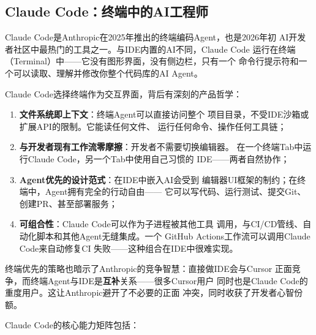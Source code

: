 \subsection{Claude Code：终端中的AI工程师}
\label{subsec:claude-code}

Claude Code是Anthropic在2025年推出的终端编码Agent，也是2026年初
AI开发者社区中最热门的工具之一。与IDE内置的AI不同，Claude Code
运行在终端（Terminal）中——它没有图形界面，没有侧边栏，只有一个
命令行提示符和一个可以读取、理解并修改你整个代码库的AI Agent。

\begin{whybox}[为什么是终端而不是IDE？]
Claude Code选择终端作为交互界面，背后有深刻的产品哲学：
\begin{enumerate}
  \item \textbf{文件系统即上下文}：终端Agent可以直接访问整个
    项目目录，不受IDE沙箱或扩展API的限制。它能读任何文件、
    运行任何命令、操作任何工具链；
  \item \textbf{与开发者现有工作流零摩擦}：开发者不需要切换编辑器。
    在一个终端Tab中运行Claude Code，另一个Tab中使用自己习惯的
    IDE——两者自然协作；
  \item \textbf{Agent优先的设计范式}：在IDE中嵌入AI会受到
    编辑器UI框架的制约；在终端中，Agent拥有完全的行动自由——
    它可以写代码、运行测试、提交Git、创建PR、甚至部署服务；
  \item \textbf{可组合性}：Claude Code可以作为子进程被其他工具
    调用，与CI/CD管线、自动化脚本和其他Agent无缝集成。一个
    GitHub Actions工作流可以调用Claude Code来自动修复CI
    失败——这种组合在IDE中很难实现。
\end{enumerate}
终端优先的策略也暗示了Anthropic的竞争智慧：直接做IDE会与Cursor
正面竞争，而终端Agent与IDE是\textbf{互补}关系——很多Cursor用户
同时也是Claude Code的重度用户。这让Anthropic避开了不必要的正面
冲突，同时收获了开发者心智份额。
\end{whybox}

Claude Code的核心能力矩阵包括：

